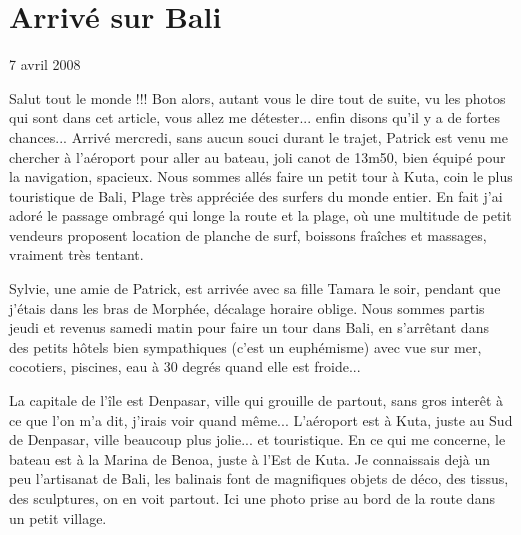 \section{Arrivé sur Bali}

7 avril 2008

\begin{multicols}{2}

Salut tout le monde !!! Bon alors, autant vous le dire tout de suite, vu les photos qui sont dans cet article, vous allez me détester... enfin disons qu'il y a de fortes chances... Arrivé mercredi, sans aucun souci durant le trajet, Patrick est venu me chercher à l'aéroport pour aller au bateau, joli canot de 13m50, bien équipé pour la navigation, spacieux. Nous sommes allés faire un petit tour à Kuta, coin le plus touristique de Bali, Plage très appréciée des surfers du monde entier. En fait j'ai adoré le passage ombragé qui longe la route et la plage, où une multitude de petit vendeurs proposent location de planche de surf, boissons fraîches et massages, vraiment très tentant.


Sylvie, une amie de Patrick, est arrivée avec sa fille Tamara le soir, pendant que j'étais dans les bras de Morphée, décalage horaire oblige. Nous sommes partis jeudi et revenus samedi matin pour faire un tour dans Bali, en s'arrêtant dans des petits hôtels bien sympathiques (c'est un euphémisme) avec vue sur mer, cocotiers, piscines, eau à 30 degrés quand elle est froide...





La capitale de l'île est Denpasar, ville qui grouille de partout, sans gros interêt à ce que l'on m'a dit, j'irais voir quand même... L'aéroport est à Kuta, juste au Sud de Denpasar, ville beaucoup plus jolie... et touristique. En ce qui me concerne, le bateau est à la Marina de Benoa, juste à l'Est de Kuta. Je connaissais dejà un peu l'artisanat de Bali, les balinais font de magnifiques objets de déco, des tissus, des sculptures, on en voit partout. Ici une photo prise au bord de la route dans un petit village.


\end{multicols}
